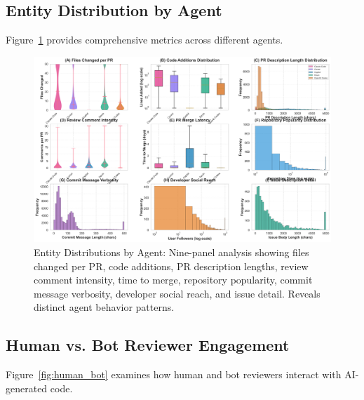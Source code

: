 \documentclass[11pt]{article}
\begin{document}
\subsection{Entity Distribution by Agent}

Figure~\ref{fig:entity_dist} provides comprehensive metrics across different agents.

\begin{figure}[H]
\centering
\includegraphics[width=\textwidth]{figures/fig3_entity_distributions.png}
\caption{Entity Distributions by Agent: Nine-panel analysis showing files changed per PR, code additions, PR description lengths, review comment intensity, time to merge, repository popularity, commit message verbosity, developer social reach, and issue detail. Reveals distinct agent behavior patterns.}
\label{fig:entity_dist}
\end{figure}

\subsection{Human vs. Bot Reviewer Engagement}

Figure~\ref{fig:human_bot} examines how human and bot reviewers interact with AI-generated code.
\end{document}
